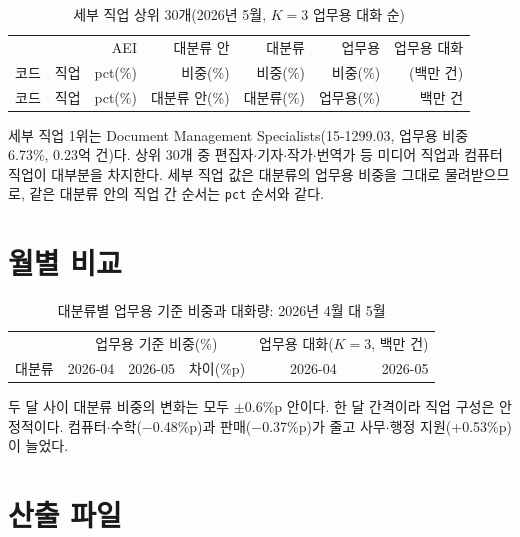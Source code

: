 \documentclass[11pt]{article}
\begin{document}
\begin{longtable}{lL{6.2cm}rrrrr}
\caption{세부 직업 상위 30개(2026년 5월, $K=3$ 업무용 대화 순)}\label{tab:detailed}\\
\toprule
 &  & AEI & 대분류 안 & 대분류 & 업무용 & 업무용 대화 \\
코드 & 직업 & pct(\%) & 비중(\%) & 비중(\%) & 비중(\%) & (백만 건) \\
\midrule
\endfirsthead
\toprule
코드 & 직업 & pct(\%) & 대분류 안(\%) & 대분류(\%) & 업무용(\%) & 백만 건 \\
\midrule
\endhead

\bottomrule
\end{longtable}

세부 직업 1위는 Document Management Specialists(15-1299.03, 업무용 비중 6.73\%, 0.23억 건)다. 상위 30개 중 편집자$\cdot$기자$\cdot$작가$\cdot$번역가 등 미디어 직업과 컴퓨터 직업이 대부분을 차지한다. 세부 직업 값은 대분류의 업무용 비중을 그대로 물려받으므로, 같은 대분류 안의 직업 간 순서는 \texttt{pct} 순서와 같다.

\section{월별 비교}

\begin{table}[htbp]
\centering
\small
\caption{대분류별 업무용 기준 비중과 대화량: 2026년 4월 대 5월}\label{tab:months}
\begin{tabular}{lrrrrr}
\toprule
 & \multicolumn{3}{c}{업무용 기준 비중(\%)} & \multicolumn{2}{c}{업무용 대화($K=3$, 백만 건)} \\
\cmidrule(lr){2-4}\cmidrule(lr){5-6}
대분류 & 2026-04 & 2026-05 & 차이(\%p) & 2026-04 & 2026-05 \\
\midrule

\bottomrule
\end{tabular}
\end{table}

두 달 사이 대분류 비중의 변화는 모두 $\pm$0.6\%p 안이다. 한 달 간격이라 직업 구성은 안정적이다. 컴퓨터$\cdot$수학($-$0.48\%p)과 판매($-$0.37\%p)가 줄고 사무$\cdot$행정 지원(+0.53\%p)이 늘었다.

\section{산출 파일}
\end{document}
